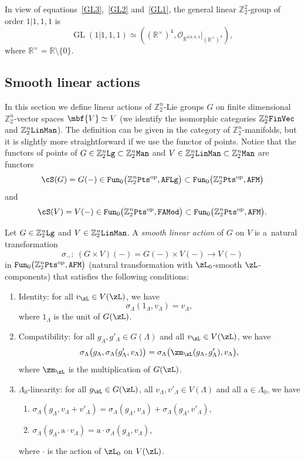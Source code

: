 \documentclass[pdftex]{sigma}%
\newcommand{\op}[1]{\operatorname{#1}}
\newcommand{\R}{{\mathbb R}}
\newcommand{\Z}{{\mathbb Z}}
\def\cO{\mathcal{O}}
\newcommand{\0}{\otimes}
\newcommand{\z}{\Z_2^n}
\numberwithin{equation}{section}
\begin{document}
\begin{Example}
In view of equations~\eqref{GL3},~\eqref{GL2} and~\eqref{GL1}, the general linear $\Z^2_2$-group of order $1|1,1,1$ is
\[
\op{GL}(1|1,1,1) \simeq \left((\R^\times)^4, \cO_{\R^{4|4,4,4}}|_{(\R^\times)^4}\right),
\]
where $\R^\times=\R\setminus\{0\}$. \end{Example}
%
\subsection{Smooth linear actions}\label{SubSec:SmoLinAct} In this section we define linear actions of $\z$-Lie groups $G$ on finite dimensional $\z$-vector spaces $\mbf{V}\simeq V$ (we identify the isomorphic categories $\z{\tt FinVec}$ and $\z{\tt LinMan}$). The definition can be given in the category of $\z$-manifolds, but it is slightly more straightforward if we use the functor of points. Notice that the functors of points of $G\in\z{\tt Lg}\subset\z{\tt Man}$ and $V\in\z{\tt LinMan}\subset\z{\tt Man}$ are functors
\[
\cS(G)=G(-)\in{\tt Fun}_0\big(\z{\tt Pts}^{\op{op}},{\tt AFLg}\big)\subset{\tt Fun}_0\big(\z{\tt Pts}^{\op{op}},{\tt AFM}\big)
\]
and
\[
\cS(V)=V(-)\in{\tt Fun}_0\big(\z{\tt Pts}^{\op{op}},{\tt FAMod}\big)\subset{\tt Fun}_0\big(\z{\tt Pts}^{\op{op}},{\tt AFM}\big).
\]

\begin{Definition}\label{SmoLinActDef}
Let $G\in\z{\tt Lg}$ and $V\in\z{\tt LinMan}$. A \emph{smooth linear action} of $G$ on $V$ is a~natural transformation
\[
\sigma_{-} \colon\ (G\times V)(-)=G(-) \times V(-) \rightarrow V(-)
\]
in ${\tt Fun}_0\big(\z{\tt Pts}^{\op{op}},{\tt AFM}\big)$ (natural transformation with $\zL_0$-smooth $\zL$-components) that satisfies the following conditions:
%
\begin{enumerate}\itemsep=0pt
\item[$(i)$] Identity: for all $v_\zL\in V(\zL)$, we have
\[
\sigma_\Lambda(1_\Lambda, v_\Lambda) = v_\Lambda,
\]
where $1_\Lambda$ is the unit of $G(\zL)$. %
\item[$(ii)$] Compatibility: for all $g_\Lambda, g'_\Lambda \in G(\Lambda)$ and all $v_\zL\in V(\zL)$, we have
\[
\sigma_\Lambda\big(g_\Lambda, \sigma_\Lambda(g'_\Lambda, v_\Lambda)\big) = \sigma_\Lambda\big(\zm_\zL(g_\Lambda, g'_\Lambda),v_\Lambda\big),
\]
where $\zm_\zL$ is the multiplication of $G(\zL)$. %
\item[$(iii)$] $\Lambda_0$-linearity: for all $g_\zL\in G(\zL)$, all $v_\Lambda, v'_\Lambda \in V(\Lambda)$ and all $\mathrm{a} \in \Lambda_0$, we have
%
\begin{enumerate}\itemsep=0pt
\item[$(a)$] $\sigma_\Lambda(g_\Lambda, v_\Lambda + v'_\Lambda) = \sigma_\Lambda(g_\Lambda, v_\Lambda) + \sigma_\Lambda(g_\Lambda, v'_\Lambda)$,
\item[$(b)$] $\sigma_\Lambda (g_\Lambda, \mathrm a\cdot v_\Lambda) = \mathrm{a} \cdot \sigma_\Lambda(g_\Lambda , v_\Lambda)$,
 \end{enumerate}
where $\cdot$ is the action of $\zL_0$ on $V(\zL)$. \end{enumerate}
\end{Definition}
\end{document}
